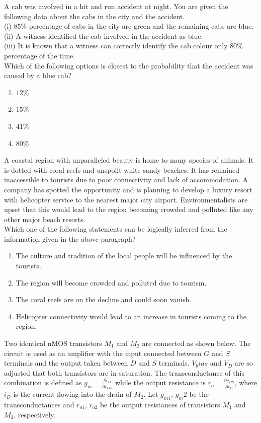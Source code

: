 \item A cab was involved in a hit and run accident at night. You are given the following data about the cabs in the city and the accident.\\
(i) $85\%$ percentage of cabs in the city are green and the remaining cabs are blue.\\
(ii) A witness identified the cab involved in the accident as blue.\\
(iii) It is known that a witness can correctly identify the cab colour only $80\%$ percentage of the time.\\
Which of the following options is closest to the probability that the accident was caused by a blue cab?
\begin{enumerate}
\item $12\%$ 
\item $15\%$
\item $41\%$
\item $80\%$
\end{enumerate}

\item A coastal region with unparalleled beauty is home to many species of animals. It is dotted with coral reefs and unspoilt white sandy beaches. It has remained inaccessible to tourists due to poor connectivity and lack of accommodation. A company has spotted the opportunity and is planning to develop a luxury resort with helicopter service to the nearest major city airport. Environmentalists are upset that this would lead to the region becoming crowded and polluted like any other major beach resorts.\\
Which one of the following statements can be logically inferred from the information given in the above paragraph?
\begin{enumerate}
\item The culture and tradition of the local people will be influenced by the tourists.
\item The region will become crowded and polluted due to tourism.
\item The coral reefs are on the decline and could soon vanish.
\item Helicopter connectivity would lead to an increase in tourists coming to the region.
\end{enumerate}

\item Two identical nMOS transistors $M_1$ and $M_2$ are connected as shown below. The circuit is used as an amplifier with the input connected between $G$ and $S$ terminals and the output taken between $D$ and $S$ terminals. $V_bias$ and 
$V_D$ are so adjusted that both transistors are in saturation. The transconductance of this combination is defined as 
$g_m = \frac{\partial i_D}{\partial v_{GS}}$ while the output resistance is $r_o = \frac{\partial v_{DS}}{\partial i_D}$, where $i_D$ is the current flowing into the drain of $M_2$. Let $g_{m1}$, $g_m2$ be the transconductances and $r_{o1}$, 
$r_{o2}$ be the output resistances of transistors $M_1$ and $M_2$, respectively.

